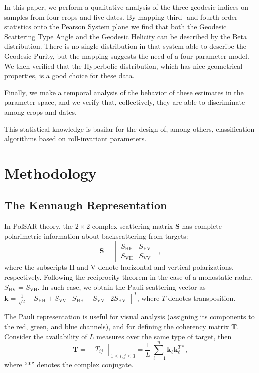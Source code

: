 \documentclass[journal]{IEEEtran}
\begin{document}
In this paper, we perform a qualitative analysis of the three geodesic indices on samples from four crops and five dates.
By mapping third- and fourth-order statistics onto the Pearson System plane we find that both the Geodesic Scattering Type Angle and the Geodesic Helicity can be described by the Beta distribution.
There is no single distribution in that system able to describe the Geodesic Purity, but the mapping suggests the need of a four-parameter model.
We then verified that the Hyperbolic distribution, which has nice geometrical properties, is a good choice for these data.

Finally, we make a temporal analysis of the behavior of these estimates in the parameter space, and we verify that, collectively, they are able to discriminate among crops and dates.

This statistical knowledge is basilar for the design of, among others, classification algorithms based on roll-invariant parameters.

\section{Methodology}

\subsection{The Kennaugh Representation}

In PolSAR theory, the $2 \times 2$ complex scattering matrix $\bm S$ has
complete polarimetric information about backscattering
from targets:
$$
\bm S = \begin{bmatrix}
S_{\text{HH}} &S_{\text{HV}}\\
S_{\text{VH}} &S_{\text{VV}}
\end{bmatrix},
$$
where the subscripts $\text{H}$ and $\text{V}$ denote horizontal and vertical
polarizations, respectively. 
Following the reciprocity theorem
in the case of a monostatic radar, 
$S_{\text{HV}}=S_{\text{VH}}$.
In such case, we obtain the Pauli scattering vector as
$
\bm k = \frac1{\sqrt{2}}
\begin{bmatrix}
S_{\text{HH}} + S_{\text{VV}} 
& S_{\text{HH}} - S_{\text{VV}} 
& 2S_{\text{HV}}
\end{bmatrix}^T
$,
where $T$ denotes transposition.

The Pauli representation is useful for visual analysis (assigning its components to the red, green, and blue channels), and for defining the coherency matrix $\bm T$.
Consider the availability of $L$ measures over the same type of target, then
$$
\bm T = \begin{bmatrix}
T_{ij}
\end{bmatrix}_{1\leq i,j\leq 3}= \frac{1}{L} \sum_{\ell=1}^{n}\bm k_\ell \bm k_\ell^{T*},
$$
where ``$*$'' denotes the complex conjugate.
\end{document}
